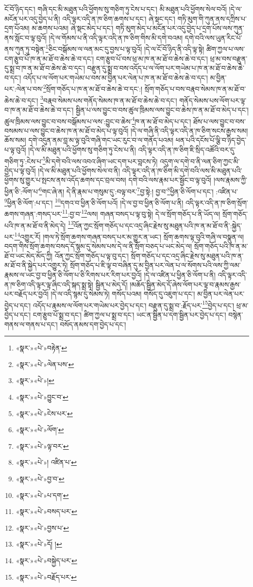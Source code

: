 ངོ་བོ་ཉིད་དང་། གཞི་དང་མི་མཐུན་པའི་ཕྱོགས་སུ་གཅིག་ཏུ་ངེས་པ་དང་། མི་མཐུན་པའི་ཕྱོགས་སེལ་བའོ། །དེ་ལ་མངོན་པར་འདུ་བྱེད་པ་ནི། འདི་ལྟར་འདི་ན་ཁ་ཅིག་ཆགས་པ་དང་། ཞེ་སྡང་དང་། གཏི་མུག་གི་ཀུན་ནས་དཀྲིས་པ་དྲག་པོའམ། མ་ཆགས་པའམ། ཞེ་སྡང་མེད་པ་དང་། གཏི་མུག་མེད་པ་མངོན་པར་འདུ་བྱེད་པ་དྲག་པོས་ལས་ཀུན་ནས་སློང་བ་ལྟ་བུའོ། །དེ་ལ་གོམས་པ་ནི་འདི་ལྟར་འདི་ན་ཁ་ཅིག་གིས་མི་དགེ་བའམ། དགེ་བའི་ལས་ཡུན་རིང་པོ་ནས་ཀུན་ཏུ་བསྟེན་\footnote{«སྣར་»«པེ་»བརྟེན་}ཅིང་བསྒོམས་ལ་ལན་མང་དུ་བྱས་པ་ལྟ་བུའོ། །དེ་ལ་ངོ་བོ་ཉིད་ནི་འདི་ལྟ་སྟེ། ཚིག་ཀྱལ་པ་ལས་ངག་རྩུབ་པོ་ཁ་ན་མ་ཐོ་བ་ཆེས་ཆེ་བ་དང་། ངག་རྩུབ་པོ་བས་ཕྲ་མ་ཁ་ན་མ་ཐོ་བ་ཆེས་ཆེ་བ་དང་། ཕྲ་མ་བས་བརྫུན་དུ་སྨྲ་བ་ཁ་ན་མ་ཐོ་བ་ཆེས་ཆེ་བ་དང་། བརྫུན་དུ་སྨྲ་བ་བས་འདོད་པ་ལ་ལོག་པར་གཡེམ་པ་ཁ་ན་མ་ཐོ་བ་ཆེས་ཆེ་བ་དང་། འདོད་པ་ལ་ལོག་པར་གཡེམ་པ་བས་མ་བྱིན་པར་ལེན་པ་ཁ་ན་མ་ཐོ་བ་ཆེས་ཆེ་བ་དང་། མ་བྱིན་པར་:ལེན་པ་བས་\footnote{«སྣར་»«པེ་»ལེན་པས་}སྲོག་གཅོད་པ་ཁ་ན་མ་ཐོ་བ་ཆེས་ཆེ་བ་དང་:། སྲོག་གཅོད་པ་བས་བརྣབ་སེམས་ཁ་ན་མ་ཐོ་བ་ཆེས་ཆེ་བ་དང་། \footnote{«སྣར་»«པེ་»།  }བརྣབ་སེམས་པས་གནོད་སེམས་ཁ་ན་མ་ཐོ་བ་ཆེས་ཆེ་བ་དང་། གནོད་སེམས་པས་ལོག་པར་ལྟ་བ་ཁ་ན་མ་ཐོ་བ་ཆེས་ཆེ་བ་དང་། སྦྱིན་པ་ལས་བྱུང་བ་བས་ཚུལ་ཁྲིམས་ལས་བྱུང་བ་ཆེས་ཁ་ན་མ་ཐོ་བ་མེད་པ་དང་། ཚུལ་ཁྲིམས་ལས་བྱུང་བ་བས་བསྒོམས་པ་ལས་:བྱུང་བ་ཆེས་\footnote{«སྣར་»«པེ་»བྱུང་བ་}ཁ་ན་མ་ཐོ་བ་མེད་པ་དང་། ཐོས་པ་ལས་བྱུང་བ་བས་བསམས་པ་ལས་བྱུང་བ་ཆེས་ཁ་ན་མ་ཐོ་བ་མེད་པ་ལྟ་བུའོ། །དེ་ལ་གཞི་ནི་འདི་ལྟར་འདི་ན་ཁ་ཅིག་སངས་རྒྱས་སམ། ཆོས་སམ། དགེ་འདུན་ནམ་བླ་མ་ལྟ་བུའི་གཞི་གང་ཡང་རུང་བ་ལ་གནོད་པའམ། ཕན་པའི་དངོས་པོ་ལྕི་བ་ཉིད་བྱེད་པ་ལྟ་བུའོ། །དེ་ལ་མི་མཐུན་པའི་ཕྱོགས་སུ་གཅིག་ཏུ་ངེས་པ་ནི། འདི་ལྟར་འདི་ན་ཁ་ཅིག་ཇི་སྲིད་འཚོའི་བར་དུ་གཅིག་ཏུ་:ངེས་པ་\footnote{«སྣར་»«པེ་»ངེས་པར་}མི་དགེ་བའི་ལས་འབའ་ཞིག་ཡང་དག་པར་བླངས་ཏེ། འདུག་ལ་དགེ་བ་ནི་ལན་ཅིག་ཀྱང་མི་བྱེད་པ་ལྟ་བུའོ། །དེ་ལ་མི་མཐུན་པའི་ཕྱོགས་སེལ་བ་ནི། འདི་ལྟར་འདི་ན་ཁ་ཅིག་མི་དགེ་བའི་ལས་མི་མཐུན་པའི་ཕྱོགས་སུ་གྱུར་པ་སྤངས་ནས་འདོད་ཆགས་དང་བྲལ་བས། དགེ་བའི་ལས་རྣམ་པར་སྦྱོང་བ་ལྟ་བུའོ། །ལས་རྣམས་ཀྱི་ཕྱིན་ཅི་:ལོག་པ་\footnote{«སྣར་»«པེ་»ལོག་}གང་ཞེ་ན། དེ་ནི་རྣམ་པ་གསུམ་དུ་:བལྟ་བར་\footnote{«སྣར་»«པེ་»ལྟ་བར་}བྱ་སྟེ:། བྱ་བ་\footnote{«སྣར་»«པེ་»།  འཛིན་པ་}ཕྱིན་ཅི་ལོག་པ་དང་། :འཛིན་པ་\footnote{«སྣར་»«པེ་»བྱ་བ་}ཕྱིན་ཅི་ལོག་:པ་དང་། \footnote{«སྣར་»«པེ་»པ་དག་}དགའ་བ་ཕྱིན་ཅི་ལོག་པའོ། །དེ་ལ་བྱ་བ་ཕྱིན་ཅི་ལོག་པ་ནི། འདི་ལྟར་འདི་ན་ཁ་ཅིག་སྲོག་ཆགས་གཞན་:གསད་པར་\footnote{«སྣར་»«པེ་»བསད་པར་}:བྱ་བ་\footnote{«སྣར་»«པེ་»བྱས་པ་}ལས། གཞན་བསད་པ་ལྟ་བུ་སྟེ། དེ་ལ་སྲོག་གཅོད་པ་ནི་ཡོད་ལ། སྲོག་གཅོད་པའི་ཁ་ན་མ་ཐོ་བ་ནི་མེད་དེ། \footnote{«སྣར་»«པེ་»དོ། ། }འོན་ཀྱང་སྲོག་གཅོད་པ་དང་འདྲ་ཞིང་རྗེས་སུ་མཐུན་པའི་ཁ་ན་མ་ཐོ་བ་ནི་:སྐྱེད་པར་\footnote{«སྣར་»«པེ་»བསྐྱེད་པར་}འགྱུར་རོ། །གལ་ཏེ་སྲོག་ཆགས་གཞན་བསད་པར་མ་གྱུར་ན་ཡང་། སྲོག་ཆགས་ལྟ་བུའི་གཞི་ལ་བསྣུན་ལ། བདག་གིས་སྲོག་ཆགས་བསད་དོ་སྙམ་དུ་སེམས་པས་དེ་ལ་ནི་སྲོག་བཅད་པ་ཡང་མེད་ལ། སྲོག་གཅོད་པའི་ཁ་ན་མ་ཐོ་བ་ཡང་མེད་མོད་ཀྱི། འོན་ཀྱང་སྲོག་གཅོད་པ་ལྟ་བུ་དང་། སྲོག་གཅོད་པ་དང་འདྲ་ཞིང་རྗེས་སུ་མཐུན་པའི་ཁ་ན་མ་ཐོ་བ་ནི་སྐྱེད་པར་འགྱུར་ཏེ། སྲོག་གཅོད་པ་ཇི་ལྟ་བ་བཞིན་དུ་མ་བྱིན་པར་ལེན་པ་ལ་སོགས་པའི་ལས་ཀྱི་ལམ་རྣམས་ལ་ཡང་བྱ་བ་ཕྱིན་ཅི་ལོག་པ་ཅི་རིགས་པར་རིག་པར་བྱའོ། །དེ་ལ་འཛིན་པ་ཕྱིན་ཅི་ལོག་པ་ནི། འདི་ལྟར་འདི་ན་ཁ་ཅིག་འདི་ལྟར་ལྟ་ཞིང་འདི་སྐད་སྨྲ་སྟེ། སྦྱིན་པ་མེད་དོ། །མཆོད་སྦྱིན་མེད་དོ་ཞེས་ལོག་པར་ལྟ་བ་རྣམས་རྒྱས་པར་བརྗོད་པར་བྱའོ། །དེ་ལ་འདི་སྙམ་དུ་སེམས་ཏེ། གསོད་པའམ། གསོད་དུ་འཇུག་པ་དང་། མ་བྱིན་པར་ལེན་པར་བྱེད་པ་དང་། འདོད་པ་རྣམས་ལ་ལོག་པར་གཡེམ་པར་བྱེད་པ་དང་། བརྫུན་དུ་སྨྲ་བ་:རྗོད་པར་\footnote{«སྣར་»«པེ་»བརྗོད་པར་}བྱེད་པ་དང་། ཕྲ་མ་བྱེད་པ་དང་། ངག་རྩུབ་པོ་སྨྲ་བ་དང་། ཚིག་ཀྱལ་པ་སྨྲ་བ་དང་། ཡང་ན་སྦྱིན་པ་དག་སྦྱིན་པར་བྱེད་པ་དང་། བསྙེན་གནས་ལ་གནས་པ་དང་། བསོད་ནམས་དག་བྱེད་པ་དང་། 